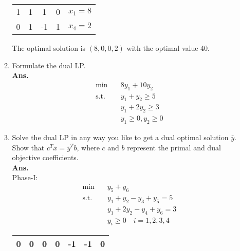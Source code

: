 \documentclass[12pt]{article}
\begin{document}
\begin{enumerate}
\begin{enumerate}
\begin{table}[H]
\begin{tabular}{cccc|c}
                                    \hline
                                    1 & 1 & 1  & 0 & $x_1=8$ \\
                                    0 & 1 & -1 & 1 & $x_4=2$ \\
                              \end{tabular}
                        \end{table}
                        The optimal solution is $(8,0,0,2)$ with the optimal value 40.
                  \item Formulate the dual LP.\\
                        \textbf{Ans.}
                        \begin{align*}
                              \min \quad        & 8y_1 + 10y_2          \\
                              \text{s.t.} \quad & y_1 + y_2 \geq 5      \\
                                                & y_1 + 2y_2 \geq 3     \\
                                                & y_1 \geq 0,y_2 \geq 0
                        \end{align*}
                  \item Solve the dual LP in any way you like to get a dual optimal solution  $\bar{y}$. Show that $c^T  \bar{x} =  \bar{y}^Tb$, where $c$ and $b$ represent the primal and dual objective coefficients.\\
                        \textbf{Ans.}\\
                        Phase-I:
                        \begin{align*}
                              \min \quad       & y_5+y_6                    \\
                              \text{s.t.}\quad & y_1 + y_2 - y_3+y_5 = 5    \\
                                               & y_1 + 2y_2 - y_4 +y_6= 3   \\
                                               & y_i \geq 0 \quad i=1,2,3,4
                        \end{align*}
                        \begin{table}[H]
                              \centering
                              \begin{tabular}{cccccc|c}
                                    0 & 0 & 0  & 0  & -1 & -1 & 0       \\
                                    \hline

\end{tabular}
\end{table}
\end{enumerate}
\end{enumerate}
\end{document}
